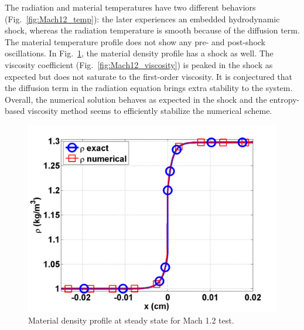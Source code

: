 \documentclass[review]{elsarticle}
\newcommand{\fig}[1]{Fig.~\ref{#1}}                      %
\begin{document}
The radiation and material temperatures have two different behaviors (\fig{fig:Mach12_temp}): the later experiences an embedded hydrodynamic shock, whereas the radiation temperature is smooth because of the diffusion term. The material temperature profile does not show any pre- and post-shock oscillations. In \fig{fig:Mach12_density}, the material density profile has a shock as well. The viscosity coefficient (\fig{fig:Mach12_viscosity}) is peaked in the shock as expected but does not saturate to the first-order viscosity. It is conjectured that the diffusion term in the radiation equation brings extra stability to the system. \\
Overall, the numerical solution behaves as expected in the shock and the entropy-based viscosity method seems to efficiently stabilize the numerical scheme.  
\begin{figure}[H]
                \centering
                \includegraphics[width=\textwidth]{Mach_1p2_nel_1000_density.png}
        \caption{Material density profile at steady state for Mach 1.2 test.}\label{fig:Mach12_density}
\end{figure}
\end{document}
